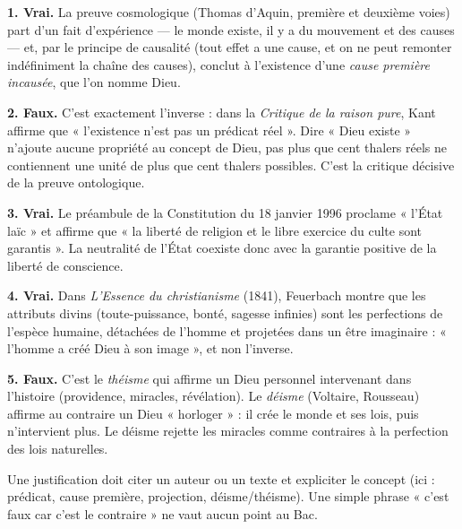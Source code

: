 \documentclass[11pt]{article}
\begin{document}
\begin{corrige}

\textbf{1. Vrai.} La preuve cosmologique (Thomas d'Aquin, première et deuxième voies) part d'un fait d'expérience — le monde existe, il y a du mouvement et des causes — et, par le principe de causalité (tout effet a une cause, et on ne peut remonter indéfiniment la chaîne des causes), conclut à l'existence d'une \emph{cause première incausée}, que l'on nomme Dieu.

\textbf{2. Faux.} C'est exactement l'inverse : dans la \emph{Critique de la raison pure}, Kant affirme que « l'existence n'est pas un prédicat réel ». Dire « Dieu existe » n'ajoute aucune propriété au concept de Dieu, pas plus que cent thalers réels ne contiennent une unité de plus que cent thalers possibles. C'est la critique décisive de la preuve ontologique.

\textbf{3. Vrai.} Le préambule de la Constitution du 18 janvier 1996 proclame « l'État laïc » et affirme que « la liberté de religion et le libre exercice du culte sont garantis ». La neutralité de l'État coexiste donc avec la garantie positive de la liberté de conscience.

\textbf{4. Vrai.} Dans \emph{L'Essence du christianisme} (1841), Feuerbach montre que les attributs divins (toute-puissance, bonté, sagesse infinies) sont les perfections de l'espèce humaine, détachées de l'homme et projetées dans un être imaginaire : « l'homme a créé Dieu à son image », et non l'inverse.

\textbf{5. Faux.} C'est le \emph{théisme} qui affirme un Dieu personnel intervenant dans l'histoire (providence, miracles, révélation). Le \emph{déisme} (Voltaire, Rousseau) affirme au contraire un Dieu « horloger » : il crée le monde et ses lois, puis n'intervient plus. Le déisme rejette les miracles comme contraires à la perfection des lois naturelles.
\end{corrige}
\begin{attention}
Une justification doit citer un auteur ou un texte et expliciter le concept (ici : prédicat, cause première, projection, déisme/théisme). Une simple phrase « c'est faux car c'est le contraire » ne vaut aucun point au Bac.
\end{attention}
\end{document}
